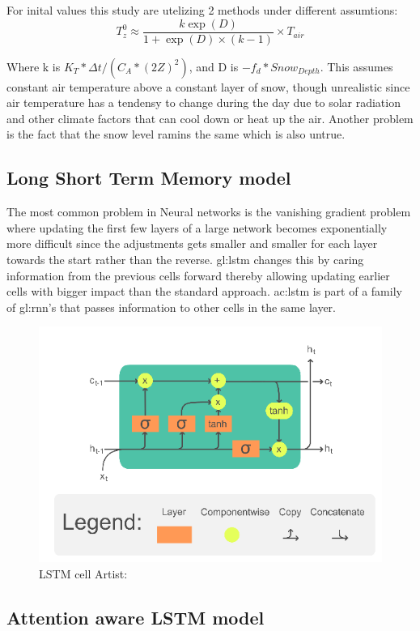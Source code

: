 For inital values this study are utelizing 2 methods under different assumtions:
$$
T_z^0 \approx \frac{k\exp(D)}{1+\exp(D)\times(k-1)}\times T_{air}
$$

Where k is $ K_T*\Delta t/ (C_A * (2Z)^2)$, and D is $-f_d*Snow_{Depth}$. This assumes constant air temperature above a constant layer of snow, though unrealistic since air temperature has a tendensy to change during the day due to solar radiation and other climate factors that can cool down or heat up the air. Another problem is the fact that the snow level ramins the same which is also untrue.
\subsection{Long Short Term Memory model}\label{sec:theory:lstm}

The most common problem in Neural networks is the vanishing gradient problem where updating the first few layers of a large network becomes exponentially more difficult since the adjustments gets smaller and smaller for each layer towards the start rather than the reverse. \gls{gl:lstm} changes this by caring information from the previous cells forward thereby allowing updating earlier cells with bigger impact than the standard approach\cite{hochreiter_long_1997}. \acrshort{ac:lstm} is part of a family of \gls{gl:rnn}'s that passes information to other cells in the same layer.

\begin{figure}[ht]
	\centering
	\includegraphics[width=0.7\linewidth]{figures/LSTM_Cell}
	\caption{LSTM cell  Artist: \textcite{chevalier_english_2018}}
	\label{fig:lstmcell}
\end{figure}

\subsection[ILSTM]{Attention aware LSTM model}\label{sec:theory:Ilstm}

